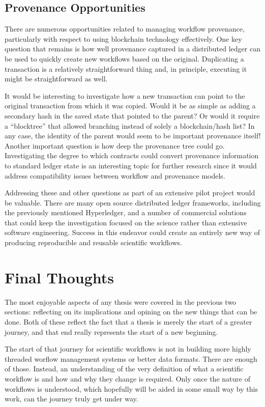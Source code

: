 \subsection{Provenance Opportunities}

There are numerous opportunities related to managing workflow provenance,
particularly with respect to using blockchain technology effectively. One
key question that remains is how well provenance captured in a distributed
ledger can be used to quickly create new workflows based on the original.
Duplicating a transaction is a relatively straightforward thing and, in
principle, executing it might be straightforward as well.

It would be interesting to investigate how a new transaction can point to the
original transaction from which it was copied. Would it be as simple as adding a
secondary hash in the saved state that pointed to the parent? Or would it
require a “blocktree” that allowed branching instead of solely a blockchain/hash
list? In any case, the identity of the parent would seem to be important
provenance itself! Another important question is how deep the provenance tree
could go. Investigating the degree to which contracts could convert provenance
information to standard ledger state is an interesting topic for further
research since it would address compatibility issues between workflow and
provenance models.

Addressing these and other questions as part of an extensive pilot project would
be valuable. There are many open source distributed ledger frameworks, including
the previously mentioned Hyperledger, and a number of commercial solutions that
could keep the investigation focused on the science rather than extensive
software engineering. Success in this endeavor could create an entirely new way
of producing reproducible and reusable scientific workflows.

\section{Final Thoughts}

The most enjoyable aspects of any thesis were covered in the previous two
sections: reflecting on its implications and opining on the new things that
can be done. Both of these reflect the fact that a thesis is merely the start
of a greater journey, and that end really represents the start of a new
beginning.

The start of that journey for scientific workflows is not in building more
highly threaded worflow management systems or better data formats. There are
enough of those. Instead, an understanding of the very definition of what a
scientific workflow is and how and why they change is required. Only once the
nature of workflows is understood, which hopefully will be aided in some small
way by this work, can the journey truly get under way.